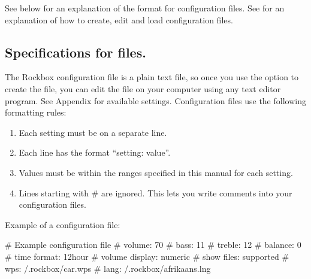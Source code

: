 	See  below for an explanation of the format 
	for configuration files.  See  for an 
	explanation of how to create, edit and load configuration files.
	
	\subsection{\label{ref:cfg_specs}Specifications for 
	files.}
	
  The Rockbox configuration file is a plain text file, so once you use the 
   option to create the file, you can edit the file on 
  your computer using any text editor program. See 
  Appendix  for available settings. Configuration 
  files use the following formatting rules: %
  
  \begin{enumerate} 
  	\item Each setting must be on a separate line. 
  	\item Each line has the format ``setting: value''. 
  	\item Values must be within the ranges specified in this manual for each 
  	setting. 
  	\item Lines starting with \# are ignored. This lets you write comments into 
  	your configuration files. 
  \end{enumerate}

	Example of a configuration file:
		\begin{example}
	  # Example configuration file
	  # volume: 70
	  # bass: 11
	  # treble: 12
	  # balance: 0
	  # time format: 12hour
	  # volume display: numeric
	  # show files: supported
	  # wps: /.rockbox/car.wps
	  # lang: /.rockbox/afrikaans.lng
		\end{example}

  

